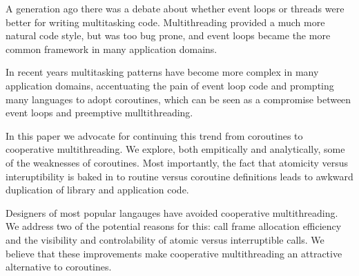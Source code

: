 \documentclass[a4paper,UKenglish,cleveref, autoref]{lipics-v2019}
\begin{document}
A generation ago there was a debate about whether event loops or threads were better for writing multitasking code.
Multithreading provided a much more natural code style, but was too bug prone, and event loops became the more common framework in many application domains.

In recent years multitasking patterns have become more complex in many application domains, accentuating the pain of event loop code and prompting many languages to adopt coroutines, which can be seen as a compromise between event loops and preemptive mulltithreading.

In this paper we advocate for continuing this trend from coroutines to cooperative multithreading.
We explore, both empitically and analytically, some of the weaknesses of coroutines.
Most importantly, the fact that atomicity versus interuptibility is baked in to routine versus coroutine definitions leads to awkward duplication of library and application code.

Designers of most popular langauges have avoided cooperative multithreading.
We address two of the potential reasons for this: call frame allocation efficiency and the visibility and controlability of atomic versus interruptible calls.
We believe that these improvements make cooperative multithreading an attractive alternative to coroutines.




% 






\end{document}
